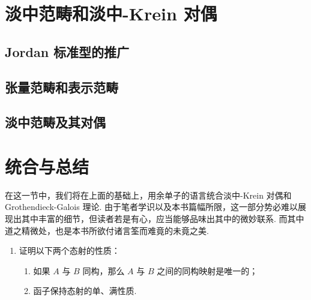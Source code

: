 \section{淡中范畴和淡中-Krein 对偶}

\subsection{Jordan 标准型的推广}

\subsection{张量范畴和表示范畴}

\subsection{淡中范畴及其对偶}

\section{统合与总结}

在这一节中，我们将在上面的基础上，用余单子的语言统合淡中-Krein 对偶和 Grothendieck-Galois 理论. 由于笔者学识以及本书篇幅所限，这一部分势必难以展现出其中丰富的细节，但读者若是有心，应当能够品味出其中的微妙联系. 而其中道之精微处，也是本书所欲付诸言筌而难竟的未竟之美.



\begin{exercise}

    \begin{enumerate}  %
        \item 证明以下两个态射的性质：
        \begin{enumerate}
            \item 如果 $A$ 与 $B$ 同构，那么 $A$ 与 $B$ 之间的同构映射是唯一的；
            \item 函子保持态射的单、满性质.
        \end{enumerate}
    \end{enumerate}
\end{exercise}

